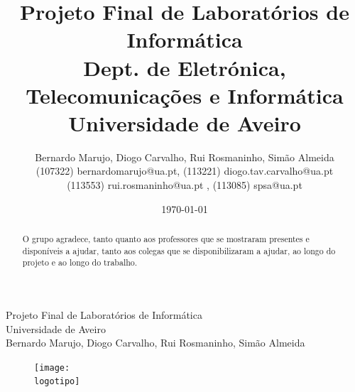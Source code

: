 \documentclass{report}
\begin{document}
%
\def\titulo{Projeto Final de Laboratórios de Informática}
\def\data{17-06-2023}
\def\autores{Bernardo Marujo, Diogo Carvalho, Rui Rosmaninho, Simão Almeida}
\def\autorescontactos{(107322) bernardomarujo@ua.pt, (113221) diogo.tav.carvalho@ua.pt\\(113553) rui.rosmaninho@ua.pt , (113085) spsa@ua.pt}
\def\departamento{Dept. de Eletrónica, Telecomunicações e Informática}
\def\empresa{Universidade de Aveiro}
\def\logotipo{ua.pdf}
%
%
\begin{titlepage}

\begin{center}
%
\vspace*{50mm}
%
{\Huge \titulo}\\ 
%
\vspace{10mm}
%
{\Large \empresa}\\
%
\vspace{10mm}
%
{\LARGE \autores}\\ 
%
\vspace{30mm}
%
\begin{figure}[h]
\center
\texttt{[image: \\logotipo]}
\end{figure}
%
\vspace{30mm}
\end{center}
%
\end{titlepage}

\title{%
{\Huge\textbf{\titulo}}\\
{\Large \departamento\\ \empresa}
}
%
\author{%
    \autores \\
    \autorescontactos
}
%
\date{\today}
%
\maketitle


\renewcommand{\abstractname}{Agradecimentos}
\begin{abstract}
O grupo agradece, tanto quanto aos professores que se mostraram presentes e disponíveis a ajudar, tanto aos colegas que se disponibilizaram a ajudar, ao longo do projeto e ao longo do trabalho.
\end{abstract}


\tableofcontents
\end{document}
